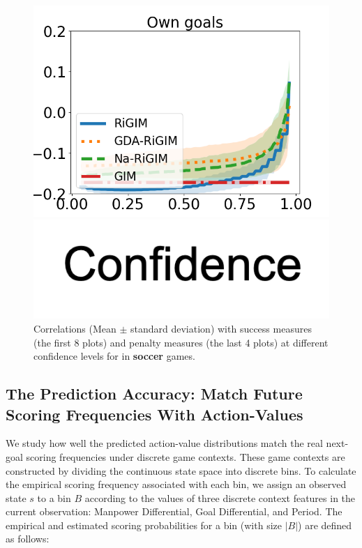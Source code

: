 \documentclass{article}
\newcommand{\state}{s}
\newcommand{\bin}{B}
\begin{document}
\begin{figure}[htbp]
\begin{minipage}{0.16\textwidth}
    \includegraphics[scale=0.14]{figures/soccer_risk_curve_OwnG_shadow.png}\par
    \vspace{-0.05in}
    \includegraphics[scale=0.12]{figures/confidence_x_label.png}
    \end{minipage}
    \vspace{-0.05in}
    \caption{Correlations (Mean $\pm$ standard deviation) with success measures (the first 8 plots) and penalty measures (the last 4 plots) at different confidence levels for in {\bf soccer} games.}\label{fig:risk-sensitivity-soccer}
\end{figure}
\subsection{The Prediction Accuracy: Match Future Scoring Frequencies With Action-Values}
We study how well the predicted action-value distributions match the real next-goal scoring frequencies under discrete game contexts. 
These game contexts are constructed by dividing the continuous state space into discrete bins. To calculate the empirical scoring frequency associated with each bin, we assign an observed state $\state$ to a bin $\bin$ according to the values of three discrete context features in the current observation: Manpower Differential, Goal Differential, and Period. The empirical and estimated scoring probabilities for a bin (with size $|\bin|$) are defined as follows:
\end{document}
